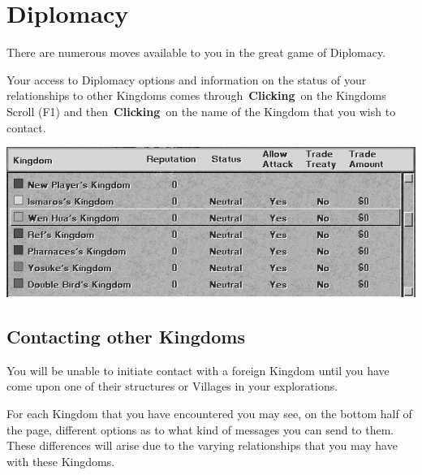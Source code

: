 
\chapter{Diplomacy}

There are numerous moves available to you in the great game of Diplomacy.

Your access to Diplomacy options and information on the status of your relationships to other Kingdoms comes through \textbf{Clicking} on the Kingdoms Scroll (F1) and then \textbf{Clicking} on the name of the Kingdom that you wish to contact.

\begin{center}
	\includegraphics[width=0.7\linewidth]{Idimplomacy}
\end{center}

\section{Contacting other Kingdoms}

You will be unable to initiate contact with a foreign Kingdom until you have come upon one of their structures or Villages in your explorations.

For each Kingdom that you have encountered you may see, on the bottom half of the page, different options as to what kind of messages you can send to them. These differences will arise due to the varying relationships that you may have with these Kingdoms.

